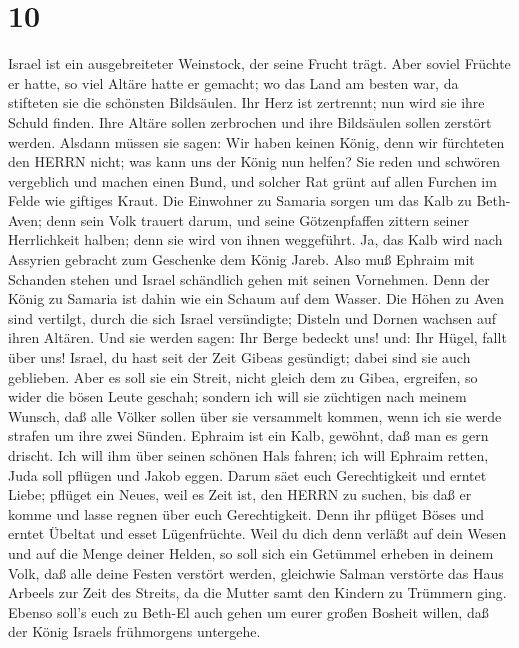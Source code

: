 \hypertarget{section-9}{%
\section{10}\label{section-9}}

 Israel ist ein ausgebreiteter Weinstock, der seine Frucht
trägt. Aber soviel Früchte er hatte, so viel Altäre hatte er gemacht; wo
das Land am besten war, da stifteten sie die schönsten Bildsäulen.
 Ihr Herz ist zertrennt; nun wird sie ihre Schuld finden.
Ihre Altäre sollen zerbrochen und ihre Bildsäulen sollen zerstört
werden.  Alsdann müssen sie sagen: Wir haben keinen König,
denn wir fürchteten den HERRN nicht; was kann uns der König nun helfen?
 Sie reden und schwören vergeblich und machen einen Bund,
und solcher Rat grünt auf allen Furchen im Felde wie giftiges Kraut.
 Die Einwohner zu Samaria sorgen um das Kalb zu Beth-Aven;
denn sein Volk trauert darum, und seine Götzenpfaffen zittern seiner
Herrlichkeit halben; denn sie wird von ihnen weggeführt. 
Ja, das Kalb wird nach Assyrien gebracht zum Geschenke dem König Jareb.
Also muß Ephraim mit Schanden stehen und Israel schändlich gehen mit
seinen Vornehmen.  Denn der König zu Samaria ist dahin wie
ein Schaum auf dem Wasser.  Die Höhen zu Aven sind vertilgt,
durch die sich Israel versündigte; Disteln und Dornen wachsen auf ihren
Altären. Und sie werden sagen: Ihr Berge bedeckt uns! und: Ihr Hügel,
fallt über uns!  Israel, du hast seit der Zeit Gibeas
gesündigt; dabei sind sie auch geblieben. Aber es soll sie ein Streit,
nicht gleich dem zu Gibea, ergreifen, so wider die bösen Leute geschah;
 sondern ich will sie züchtigen nach meinem Wunsch, daß
alle Völker sollen über sie versammelt kommen, wenn ich sie werde
strafen um ihre zwei Sünden.  Ephraim ist ein Kalb,
gewöhnt, daß man es gern drischt. Ich will ihm über seinen schönen Hals
fahren; ich will Ephraim retten, Juda soll pflügen und Jakob eggen.
 Darum säet euch Gerechtigkeit und erntet Liebe; pflüget
ein Neues, weil es Zeit ist, den HERRN zu suchen, bis daß er komme und
lasse regnen über euch Gerechtigkeit.  Denn ihr pflüget
Böses und erntet Übeltat und esset Lügenfrüchte.  Weil du
dich denn verläßt auf dein Wesen und auf die Menge deiner Helden, so
soll sich ein Getümmel erheben in deinem Volk, daß alle deine Festen
verstört werden, gleichwie Salman verstörte das Haus Arbeels zur Zeit
des Streits, da die Mutter samt den Kindern zu Trümmern ging.
 Ebenso soll's euch zu Beth-El auch gehen um eurer großen
Bosheit willen, daß der König Israels frühmorgens untergehe.

